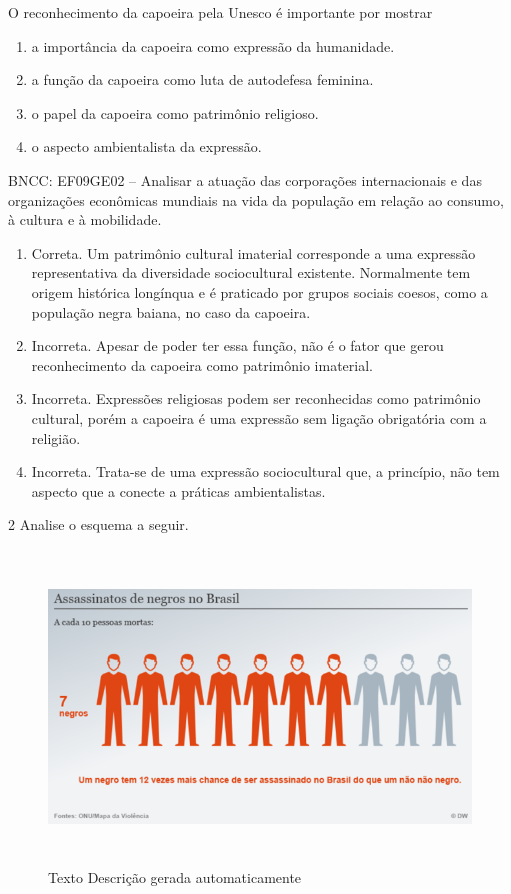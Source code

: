 O reconhecimento da capoeira pela Unesco é importante por mostrar

\begin{enumerate}
\def\labelenumi{\alph{enumi})}
\item
  a importância da capoeira como expressão da humanidade.
\item
  a função da capoeira como luta de autodefesa feminina.
\item
  o papel da capoeira como patrimônio religioso.
\item
  o aspecto ambientalista da expressão.
\end{enumerate}

BNCC: EF09GE02 -- Analisar a atuação das corporações internacionais e
das organizações econômicas mundiais na vida da população em relação ao
consumo, à cultura e à mobilidade.

\begin{enumerate}
\def\labelenumi{\alph{enumi})}
\item
  Correta. Um patrimônio cultural imaterial corresponde a uma expressão
  representativa da diversidade sociocultural existente. Normalmente tem
  origem histórica longínqua e é praticado por grupos sociais coesos,
  como a população negra baiana, no caso da capoeira.
\item
  Incorreta. Apesar de poder ter essa função, não é o fator que gerou
  reconhecimento da capoeira como patrimônio imaterial.
\item
  Incorreta. Expressões religiosas podem ser reconhecidas como
  patrimônio cultural, porém a capoeira é uma expressão sem ligação
  obrigatória com a religião.
\item
  Incorreta. Trata-se de uma expressão sociocultural que, a princípio,
  não tem aspecto que a conecte a práticas ambientalistas.
\end{enumerate}

\num{2} Analise o esquema a seguir.

\begin{figure}
\centering
\includegraphics[width=5.90556in,height=3.27708in]{./imgSAEB_9_CHUM3/media/image2.png}
\caption{Texto Descrição gerada automaticamente}
\end{figure}

